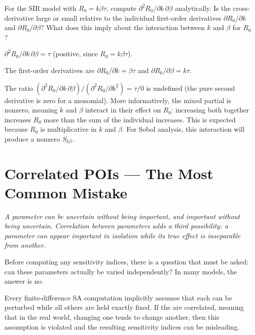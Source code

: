 \begin{selfcheck}
For the SIR model with $R_0 = k\beta\tau$,
compute $\partial^2 R_0/\partial k\,\partial\beta$ analytically.
Is the cross-derivative large or small relative to the individual
first-order derivatives $\partial R_0/\partial k$ and
$\partial R_0/\partial\beta$? What does this imply about
the interaction between $k$ and $\beta$ for $R_0$?
\end{selfcheck}
\begin{scAnswer}
$\partial^2 R_0/\partial k\,\partial\beta = \tau$
(positive, since $R_0 = k\beta\tau$).

The first-order derivatives are
$\partial R_0/\partial k = \beta\tau$ and
$\partial R_0/\partial\beta = k\tau$.

The ratio $(\partial^2 R_0/\partial k\,\partial\beta) / (\partial^2 R_0/\partial k^2) = \tau / 0$
is undefined (the pure second derivative is zero for a monomial).
More informatively, the mixed partial is nonzero, meaning $k$ and $\beta$
interact in their effect on $R_0$: increasing both together increases $R_0$
more than the sum of the individual increases. This is expected because $R_0$
is multiplicative in $k$ and $\beta$.
For Sobol analysis, this interaction will produce a nonzero $S_{k\beta}$.
\end{scAnswer}

\section{Correlated POIs --- The Most Common Mistake}
\label{sec:correlatedPOIs}

\begin{tcolorbox}[colback=gray!8, colframe=gray!40, boxrule=0.4pt, arc=2pt]
\textit{A parameter can be uncertain without being important,
and important without being uncertain.
Correlation between parameters adds a third possibility:
a parameter can appear important in isolation
while its true effect is inseparable from another.}
\end{tcolorbox}

\medskip

Before computing any sensitivity indices, there is a question
that must be asked: can these parameters actually be varied
independently? In many models, the answer is no.

Every finite-difference SA computation implicitly assumes that
each \POI can be perturbed while all others are held exactly fixed.
If the \POIs are correlated, meaning that in the real world,
changing one tends to change another, then this assumption
is violated and the resulting sensitivity indices can be misleading.

